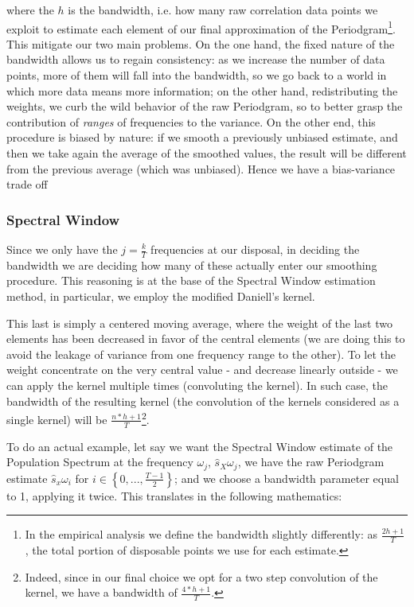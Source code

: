 \documentclass[12pt]{article} %
\begin{document}
where the $h$ is the bandwidth, i.e. how many raw correlation data points we exploit to estimate each element of our final approximation of the Periodgram\footnote{In the empirical analysis we define the bandwidth slightly differently: as $\frac{2h+1}{T}$, the total portion of disposable points we use for each estimate.}. This mitigate our two main problems. On the one hand, the fixed nature of the bandwidth allows us to regain consistency: as we increase the number of data points, more of them will fall into the bandwidth, so we go back to a world in which more data means more information; on the other hand, redistributing the weights, we curb the wild behavior of the raw Periodgram, so to better grasp the contribution of {\em ranges} of frequencies to the variance. On the other end, this procedure is biased by nature: if we smooth a previously unbiased estimate, and then we take again the average of the smoothed values, the result will be different from the previous average (which was unbiased). Hence we have a bias-variance trade off
 
\subsubsection{Spectral Window}

Since we only have the  $j=\frac{k}{T}$ frequencies at our disposal, in deciding the bandwidth we are deciding how many of these actually enter our smoothing procedure. This reasoning is at the base of the Spectral Window estimation method, in particular, we employ the modified Daniell's kernel. 

This last is simply a centered moving average, where the weight of the last two elements has been decreased in favor of the central elements (we are doing this to avoid the leakage of variance from one frequency range to the other). To let the weight concentrate on the very central value - and decrease linearly outside - we can apply the kernel multiple times (convoluting the kernel). In such case, the bandwidth of the resulting kernel (the convolution of the kernels considered as a single kernel) will be $\frac{n*h+1}{T}$\footnote{
Indeed, since in our final choice we opt for a two step convolution of the kernel, we have a bandwidth of $\frac{4*h+1}{T}$.}.

To do an actual example, let say we want the Spectral Window estimate of the Population Spectrum at the frequency $\omega_j$, $\hat{s}_X{\omega_j}$, we have the raw Periodgram estimate $\hat{s}_x{\omega_i}$ for $i\in\left\{0,...,\frac{T-1}{2}\right\}$; and we choose a bandwidth parameter equal to 1, applying it twice. This translates in the following mathematics:
\end{document}
